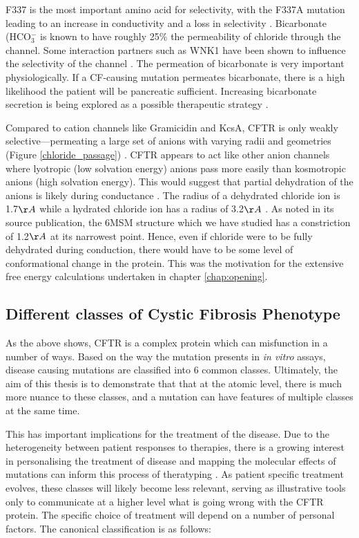 F337 is the most important amino acid for selectivity, with the F337A mutation leading to an increase in conductivity and a loss in selectivity \cite{wei2016}. Bicarbonate (HCO$_3^-$ is known to have roughly 25\% the permeability of chloride through the channel\cite{tang2009}. Some interaction partners such as WNK1 have been shown to influence the selectivity of the channel \cite{kim2019, garnett2011, kim2019a}. The permeation of bicarbonate is very important physiologically. If a CF-causing mutation permeates bicarbonate, there is a high likelihood the patient will be pancreatic sufficient. Increasing bicarbonate secretion is being explored as a possible therapeutic strategy \cite{ferrera2021}. 

Compared to cation channels like Gramicidin and KcsA, CFTR is only weakly selective---permeating a large set of anions with varying radii and geometries (Figure \ref{chloride_passage}) \cite{linsdell1998, tabcharani1997, poulsen1994}. CFTR appears to act like other anion channels where lyotropic (low solvation energy) anions pass more easily than kosmotropic anions (high solvation energy). This would suggest that partial dehydration of the anions is likely during conductance \cite{linsdell2000}. The radius of a dehydrated chloride ion is 1.7$\AA$ while a hydrated chloride ion has a radius of 3.2$\AA$ \cite{yang2002}. As noted in its source publication, the 6MSM structure which we have studied has a constriction of 1.2$\AA$ at its narrowest point. Hence, even if chloride were to be fully dehydrated during conduction, there would have to be some level of conformational change in the protein. This was the motivation for the extensive free energy calculations undertaken in chapter \ref{chap:opening}.

\subsection{Different classes of Cystic Fibrosis Phenotype}
As the above shows, CFTR is a complex protein which can misfunction in a number of ways. Based on the way the mutation presents in \textit{in vitro} assays, disease causing mutations are classified into 6 common classes. Ultimately, the aim of this thesis is to demonstrate that that at the atomic level, there is much more nuance to these classes, and a mutation can have features of multiple classes at the same time.

This has important implications for the treatment of the disease. Due to the heterogeneity between patient responses to therapies, there is a growing interest in personalising the treatment of disease and mapping the molecular effects of mutations can inform this process of theratyping \cite{crawford2018,sette2021}. As patient specific treatment evolves, these classes will likely become less relevant, serving as illustrative tools only to communicate at a higher level what is going wrong with the CFTR protein. The specific choice of treatment will depend on a number of personal factors. The canonical classification is as follows:

